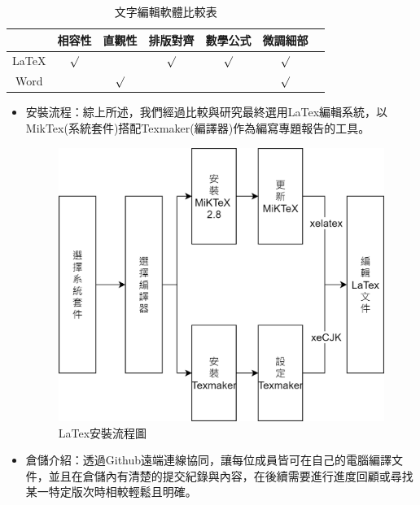 \documentclass[14pt,a4paper]{report}  %
\begin{document}
{{{		 \begin{table}[htbp] %
			\centering%
			\caption{文字編輯軟體比較表}%
			\large%
			\label{tab_文字編輯軟體比較表:scale}
			\begin{tabular}{|c|c|c|c|c|c|c|}
			\hline
			\diagbox[width=4em]& 相容性 & 直觀性 & 排版對齊 & 數學公式 & 微調細部\\ 
			\hline
			LaTeX 		&$\surd$&		&$\surd$&$\surd$&$\surd$\\
			\hline
			Word	 	&		&$\surd$&		&		&$\surd$\\
			\hline
			
			\end{tabular}
		\end{table}	
		
		 \begin{itemize}
		 \item 安裝流程：綜上所述，我們經過比較與研究最終選用LaTex編輯系統，以MikTex(系統套件)搭配Texmaker(編譯器)作為編寫專題報告的工具。
		 
        \begin{figure}[H]
        \centering
        \includegraphics[scale=0.2]{LaTex安裝流程圖.png} 
        \caption{LaTex安裝流程圖} 
		\label{fig_LaTex安裝流程圖:scale}
    	\end{figure}
		 
		 \item 倉儲介紹：透過Github遠端連線協同，讓每位成員皆可在自己的電腦編譯文件，並且在倉儲內有清楚的提交紀錄與內容，在後續需要進行進度回顧或尋找某一特定版次時相較輕鬆且明確。
        

\end{itemize}}}}
\end{document}
